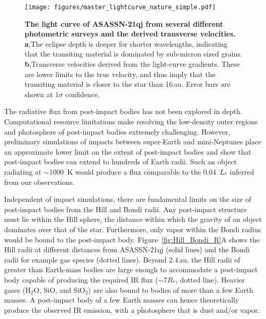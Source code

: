 \documentclass[sn-nature,oneside]{sn-jnl}%
\begin{document}
\begin{figure*}
\begin{centering}
\texttt{[image: figures/master\_lightcurve\_nature\_simple.pdf]}
      \caption{\textbf{The light curve of ASASSN-21qj from several different photometric surveys and the derived transverse velocities.}
      {\bf a},The eclipse depth is deeper for shorter wavelengths, indicating that the transiting material is dominated by sub-micron sized grains.
      {\bf b},Transverse velocities derived from the light-curve gradients.
      These are lower limits to the true velocity, and thus imply that the transiting material is closer to the star than 16\,au.
      Error bars are shown at $1\sigma$ confidence.
      }
        \label{fig:eclipse_overview}

\end{centering}
\end{figure*}


The radiative flux from post-impact bodies has not been explored in depth.
%
Computational resource limitations make resolving the low-density outer regions and photosphere of post-impact bodies extremely challenging.
%
However, preliminary simulations of impacts between super-Earth and mini-Neptunes place an approximate lower limit on the extent of post-impact bodies and show that post-impact bodies can extend to hundreds of Earth radii.
%
Such an object radiating at $\sim$1000~K would produce a flux comparable to the 0.04~$L_*$ inferred from our observations. 

Independent of impact simulations, there are fundamental limits on the size of post-impact bodies from the Hill and Bondi radii.
%
Any post-impact structure must lie within the Hill sphere, the distance within which the gravity of an object dominates over that of the star.
%
Furthermore, only vapor within the Bondi radius would be bound to the post-impact body.
%
Figure~\ref{fig:Hill_Bondi_R}A shows the Hill radii at different distances from ASASSN-21qj (solid lines) and the Bondi radii for example gas species (dotted lines).
%
Beyond 2.4\,au, the Hill radii of greater than Earth-mass bodies are large enough to accommodate a post-impact body capable of producing the required IR flux ($\sim7R_*$, dotted line). 
%
Heavier gases (H$_2$O, SiO, and SiO$_2$) are also bound to bodies of more than a few Earth masses.
%
A post-impact body of a few Earth masses can hence theoretically produce the observed IR emission, with a photosphere that is dust and/or vapor.
\end{document}
